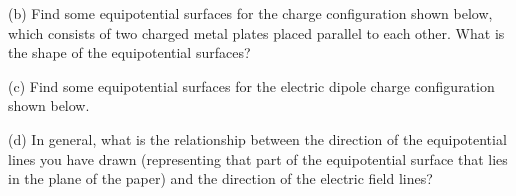 (b) Find some equipotential surfaces for the charge configuration
shown below, which consists of two charged metal plates placed parallel
to each other. What is the shape of the equipotential surfaces?

{\centering {} \par}

(c) Find some equipotential surfaces for the electric dipole charge
configuration shown below.

\vspace{0.3cm}
{\centering {} \par}
\vspace{0.3cm}

(d) In general, what is the relationship between the direction of
the equipotential lines you have drawn (representing that part of
the equipotential surface that lies in the plane of the paper) and
the direction of the electric field lines?
\answerspace{10mm}


